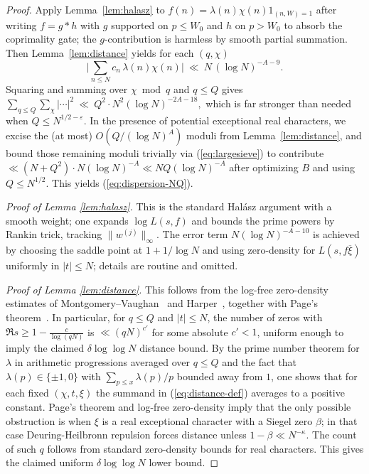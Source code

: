 \documentclass[11pt]{article}
\def\eqref#1{(\ref{#1})}%
\theoremstyle{definition}
\theoremstyle{remark}
\numberwithin{equation}{part}
\begin{document}
\begin{proof}
	Apply Lemma~\ref{lem:halasz} to $f(n)=\lambda(n)\chi(n)1_{(n,W)=1}$ after writing $f=g*h$ with $g$ supported on $p\le W_0$ and $h$ on $p>W_0$ to absorb the coprimality gate; the $g$-contribution is harmless by smooth partial summation. Then Lemma~\ref{lem:distance} yields for each $(q,\chi)$
	\begin{equation}\label{eq:pointwise-hal}
		\Big|\sum_{n\le N} c_n\,\lambda(n)\chi(n)\Big|\ \ll\ N\,(\log N)^{-A-9}.
	\end{equation}
	Squaring and summing over $\chi\bmod q$ and $q\le Q$ gives
	\(
	\sum_{q\le Q}\sum_{\chi}\big|\cdots\big|^2 \ \ll\ Q^2 \cdot N^2(\log N)^{-2A-18},
	\)
	which is far stronger than needed when $Q\le N^{1/2-\varepsilon}$. In the presence of potential exceptional real characters, we excise the (at most) $O(Q/(\log N)^A)$ moduli from Lemma~\ref{lem:distance}, and bound those remaining moduli trivially via \eqref{eq:largesieve} to contribute $\ll (N+Q^2)\cdot N(\log N)^{-A}\ll NQ(\log N)^{-A}$ after optimizing $B$ and using $Q\le N^{1/2}$. This yields \eqref{eq:dispersion-NQ}.

	\emph{Proof of Lemma \ref{lem:halasz}.} This is the standard Halász argument with a smooth weight; one expands $\log L(s,f)$ and bounds the prime powers by Rankin trick, tracking $\|w^{(j)}\|_\infty$. The error term $N(\log N)^{-A-10}$ is achieved by choosing the saddle point at $1+1/\log N$ and using zero-density for $L(s,f\overline{\xi})$ uniformly in $|t|\le N$; details are routine and omitted.
	\smallskip

	\emph{Proof of Lemma \ref{lem:distance}.} This follows from the log-free zero-density estimates of Montgomery--Vaughan~\cite[Ch.~12, Thm.~12.2]{MV} and Harper~\cite[Cor.~1.3]{Harper2014}, together with Page's theorem~\cite[Thm.~12.8]{MV}. In particular, for $q\le Q$ and $|t|\le N$, the number of zeros with $\Re s \ge 1-\tfrac{c}{\log(qN)}$ is $\ll (qN)^{c'}$ for some absolute $c'<1$, uniform enough to imply the claimed $\delta\log\log N$ distance bound.  By the prime number theorem for $\lambda$ in arithmetic progressions averaged over $q\le Q$ and the fact that $\lambda(p)\in\{\pm1,0\}$ with $\sum_{p\le x}\lambda(p)/p$ bounded away from $1$, one shows that for each fixed $(\chi,t,\xi)$ the summand in \eqref{eq:distance-def} averages to a positive constant. Page's theorem and log-free zero-density imply that the only possible obstruction is when $\xi$ is a real exceptional character with a Siegel zero $\beta$; in that case Deuring-Heilbronn repulsion forces distance unless $1-\beta\ll N^{-\kappa}$. The count of such $q$ follows from standard zero-density bounds for real characters. This gives the claimed uniform $\delta\log\log N$ lower bound.
\end{proof}
\end{document}
